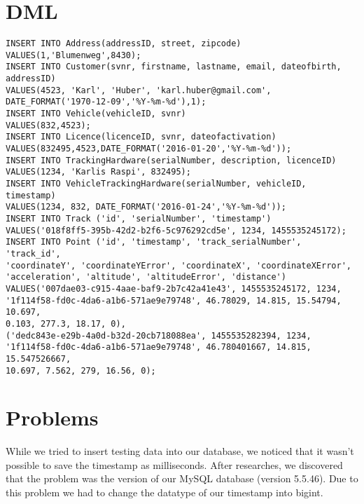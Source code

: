 \section{DML}
\begin{verbatim}
INSERT INTO Address(addressID, street, zipcode)
VALUES(1,'Blumenweg',8430);
INSERT INTO Customer(svnr, firstname, lastname, email, dateofbirth, addressID)
VALUES(4523, 'Karl', 'Huber', 'karl.huber@gmail.com',
DATE_FORMAT('1970-12-09','%Y-%m-%d'),1);
INSERT INTO Vehicle(vehicleID, svnr)
VALUES(832,4523);
INSERT INTO Licence(licenceID, svnr, dateofactivation)
VALUES(832495,4523,DATE_FORMAT('2016-01-20','%Y-%m-%d'));
INSERT INTO TrackingHardware(serialNumber, description, licenceID)
VALUES(1234, 'Karlis Raspi', 832495);
INSERT INTO VehicleTrackingHardware(serialNumber, vehicleID, timestamp)
VALUES(1234, 832, DATE_FORMAT('2016-01-24','%Y-%m-%d'));
INSERT INTO Track ('id', 'serialNumber', 'timestamp') 
VALUES('018f8ff5-395b-42d2-b2f6-5c976292cd5e', 1234, 1455535245172);
INSERT INTO Point ('id', 'timestamp', 'track_serialNumber', 'track_id', 
'coordinateY', 'coordinateYError', 'coordinateX', 'coordinateXError', 
'acceleration', 'altitude', 'altitudeError', 'distance') 
VALUES('007dae03-c915-4aae-baf9-2b7c42a41e43', 1455535245172, 1234, 
'1f114f58-fd0c-4da6-a1b6-571ae9e79748', 46.78029, 14.815, 15.54794, 10.697, 
0.103, 277.3, 18.17, 0),
('dedc843e-e29b-4a0d-b32d-20cb718088ea', 1455535282394, 1234, 
'1f114f58-fd0c-4da6-a1b6-571ae9e79748', 46.780401667, 14.815, 15.547526667, 
10.697, 7.562, 279, 16.56, 0);
\end{verbatim}
\section{Problems}
While we tried to insert testing data into our database, we noticed that it wasn’t possible to save the timestamp as milliseconds. After researches, we discovered that the problem was the version of our MySQL database (version 5.5.46). Due to this problem we had to change the datatype of our timestamp into bigint.